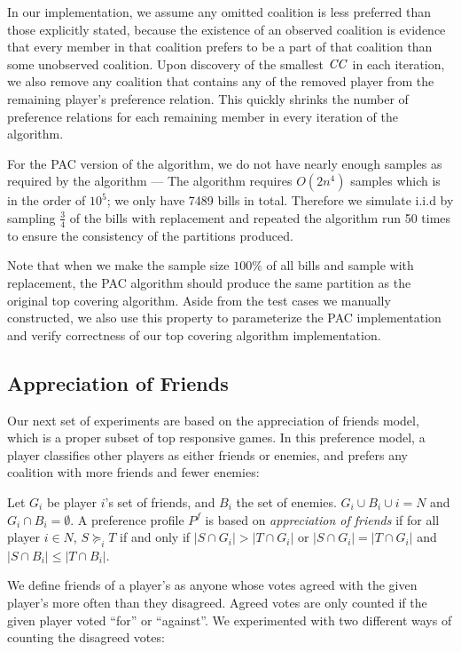 In our implementation, we assume any omitted coalition is less preferred
than those explicitly stated, because the existence of an observed
coalition is evidence that every member in that coalition prefers to be
a part of that coalition than some unobserved coalition.
Upon discovery of the smallest $\mathit{CC}$ in each iteration, we also remove any coalition that contains any of the removed player from the remaining player's preference relation. This quickly shrinks the number of preference relations for each remaining member in every iteration of the algorithm.

For the PAC version of the algorithm, we do not have nearly enough samples
as required by the algorithm --- The algorithm requires $O(2n^4)$ samples
which is in the order of $10^5$; we only have 7489 bills in total.
Therefore we simulate i.i.d by sampling $\frac{3}{4}$ of the bills
with replacement and repeated the algorithm run 50 times to ensure
the consistency of the partitions produced.

Note that when we make the sample size $100\%$ of all bills and sample
with replacement, the PAC algorithm should produce the same partition
as the original top covering algorithm.
Aside from the test cases we manually constructed, we also use this property to parameterize the PAC implementation and verify correctness of
our top covering algorithm implementation.


\subsection{Appreciation of Friends}
\label{subsec:appreciation_of_friends}

Our next set of experiments are based on the appreciation of friends model,
which is a proper subset of top responsive games.
In this preference model, a player classifies other players as either friends
or enemies, and prefers any coalition with more friends and fewer enemies:

Let $G_i$ be player $i$'s set of friends, and $B_i$ the set of enemies. $G_i \cup B_i \cup i = N$ and $G_i \cap B_i = \emptyset$. A preference profile $P^f$ is based on \textit{appreciation of friends} if for all player $i \in N$, $S \succeq_i T$ if and only if $|S \cap G_i| > |T \cap G_i|$ or $|S \cap G_i| = |T \cap G_i|$ and $|S \cap B_i| \leq |T \cap B_i|$.

We define friends of a player's as anyone whose votes agreed with the given
player's more often than they disagreed.
Agreed votes are only counted if the given player voted ``for'' or ``against''.
We experimented with two different ways of counting the disagreed votes:

